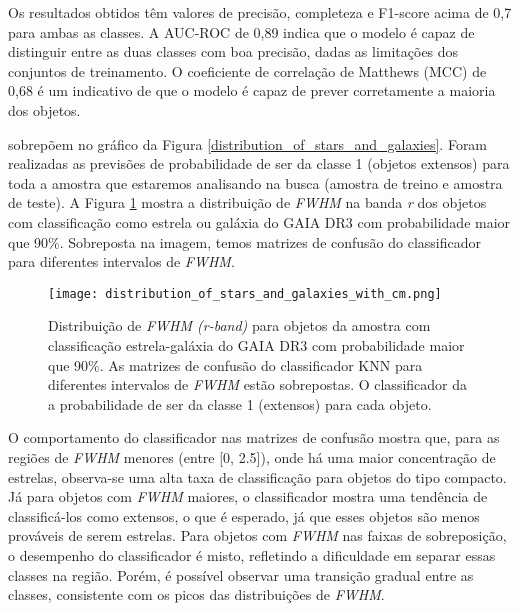 Os resultados obtidos têm valores de precisão, completeza e F1-score acima de 0,7 para ambas as classes. A AUC-ROC de 0,89 indica que o modelo é capaz de distinguir entre as duas classes com boa precisão, dadas as limitações dos conjuntos de treinamento. O coeficiente de correlação de Matthews (MCC) de 0,68 é um indicativo de que o modelo é capaz de prever corretamente a maioria dos objetos.


sobrepõem no gráfico da Figura \ref{distribution_of_stars_and_galaxies}. Foram realizadas as previsões de probabilidade de ser da classe 1 (objetos extensos) para toda a amostra que estaremos analisando na busca (amostra de treino e amostra de teste). A Figura \ref{probabilidade_extensos_fwhm} mostra a distribuição de \textit{FWHM} na banda \textit{r} dos objetos com classificação como estrela ou galáxia do GAIA DR3 com probabilidade maior que 90\%. Sobreposta na imagem, temos matrizes de confusão do classificador para diferentes intervalos de \textit{FWHM}.

\begin{figure}[!ht]
    \centering
    \texttt{[image: distribution\_of\_stars\_and\_galaxies\_with\_cm.png]}
    \caption[]{Distribuição de \textit{FWHM (r-band)} para objetos da amostra com classificação estrela-galáxia do GAIA DR3 com probabilidade maior que 90\%. As matrizes de confusão do classificador KNN para diferentes intervalos de \textit{FWHM} estão sobrepostas. O classificador da a probabilidade de ser da classe 1 (extensos) para cada objeto. }
    \label{probabilidade_extensos_fwhm}
\end{figure}

O comportamento do classificador nas matrizes de confusão mostra que, para as regiões de \textit{FWHM} menores (entre [0, 2.5]), onde há uma maior concentração de estrelas, observa-se uma alta taxa de classificação para objetos do tipo compacto. Já para objetos com \textit{FWHM} maiores, o classificador mostra uma tendência de classificá-los como extensos, o que é esperado, já que esses objetos são menos prováveis de serem estrelas. Para objetos com \textit{FWHM} nas faixas de sobreposição, o desempenho do classificador é misto, refletindo a dificuldade em separar essas classes na região. Porém, é possível observar uma transição gradual entre as classes, consistente com os picos das distribuições de \textit{FWHM}.

